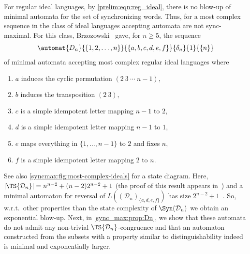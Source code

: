 For regular ideal languages, by \cref{prelim:eqn:reg_ideal},
there is no blow-up of minimal automata for 
the set of synchronizing words. Thus,
for a most complex sequence in the class of ideal languages
accepting automata are not sync-maximal.
For this class, Brzozowski~\cite{DBLP:journals/dmtcs/BrzozowskiDL16} 
gave, for $n \ge 5$, 
the sequence 
\[
\automat{D_n}{\{1,2,\ldots,n\}}{\{a,b,c,d,e,f\}}{\delta_n}{1}{\{n\}}
\] 
of minimal automata accepting most complex regular ideal languages where 
\begin{enumerate}
	\item $a$ induces the cyclic permutation $(2 ~ 3 ~ \cdots ~ n - 1)$,
	
	\item $b$ induces the transposition $(2 ~3)$, 
	
	\item  $c$ is a simple idempotent letter mapping $n - 1$ to $2$, 
	
	\item  $d$ is a simple idempotent letter mapping $n - 1$ to $1$,
	
	\item $e$ maps everything in $\{1,\ldots,n-1\}$ to $2$ and fixes $n$,
	
	\item $f$ is a simple idempotent letter mapping $2$ to $n$.
\end{enumerate}
See also \cref{syncmax:fig:most-complex-ideals} for a state diagram.
Here, $|\TS{\mathcal D_n}| = n^{n-2} + (n-2)2^{n-2} + 1$ (the proof
of this result appears in~\cite{BrzozowskiSY18})
and a minimal automaton for reversal of $L((\mathcal D_n)_{\{a,d,e,f\}})$ 
has size $2^{n-2} + 1$~\cite{DBLP:journals/dmtcs/BrzozowskiDL16}.
So, w.r.t.~other properties than the state complexity of $\Syn(\mathcal D_n)$
we obtain an exponential blow-up. Next, in \cref{sync_max:prop:Dn},
we show that these automata do not admit any non-trivial $\TS{\mathcal D_n}$-congruence
and that an automaton constructed from the subsets
with a property similar to distinguishability
indeed is minimal and exponentially larger.


